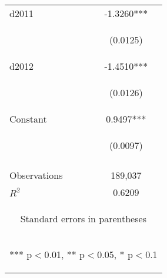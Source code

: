 \begin{center}
\begin{tabular}{lc}
d2011 & -1.3260*** \\
\vspace{4pt} & \begin{footnotesize}(0.0125)\end{footnotesize} \\
d2012 & -1.4510*** \\
\vspace{4pt} & \begin{footnotesize}(0.0126)\end{footnotesize} \\
Constant & 0.9497*** \\
 & \begin{footnotesize}(0.0097)\end{footnotesize} \\
\vspace{4pt} & \begin{footnotesize}\end{footnotesize} \\
Observations & 189,037 \\
 $R^2$ & 0.6209 \\ \hline
\multicolumn{2}{c}{\begin{footnotesize} Standard errors in parentheses\end{footnotesize}} \\
\multicolumn{2}{c}{\begin{footnotesize} *** p$<$0.01, ** p$<$0.05, * p$<$0.1\end{footnotesize}} \\
\end{tabular}
\end{center}
